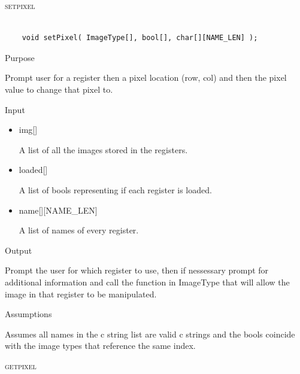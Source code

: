 \documentclass[pdftex, 11pt]{article}
\begin{document}
\begin{description}
\begin{description}
		\end{description}



	\item{\textsc{setpixel}}

		\begin{lstlisting}

	void setPixel( ImageType[], bool[], char[][NAME_LEN] );
		\end{lstlisting}

		\begin{description}
			\item{Purpose}

				Prompt user for a register then a pixel location (row, col) and then the pixel
				value to change that pixel to.

			\item{Input}

				\begin{itemize}

					\item{img[]}

						A list of all the images stored in the registers.

					\item{loaded[]}

						A list of bools representing if each register is loaded.

					\item{name[][NAME\_LEN]}

						A list of names of every register.

				\end{itemize}

			\item{Output}

				Prompt the user for which register to use, then if nessessary
				prompt for additional information and call the function
				in ImageType that will allow the image in that register to
				be manipulated.

			\item{Assumptions}

				Assumes all names in the c string list are valid c
				strings and the bools coincide with the image types that
				reference the same index.

		\end{description}



	\item{\textsc{getpixel}}


\end{description}
\end{document}
